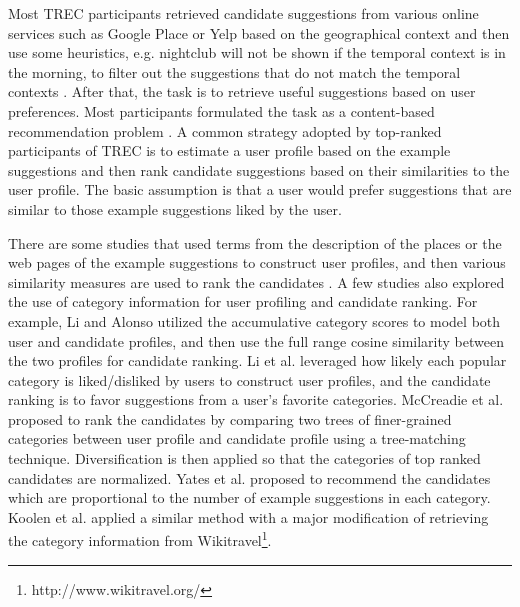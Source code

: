 Most TREC participants retrieved candidate suggestions from various 
online services such as 
Google Place %
or Yelp %
based on the geographical context and then use some heuristics, 
e.g. nightclub will not be shown if the temporal context is in the morning, 
to filter out the suggestions that do not match the temporal contexts 
\cite{adriel:overview, adriel:overview2013}.
After that, the task is to retrieve useful suggestions based on 
user preferences. Most participants formulated the task as a 
content-based recommendation problem 
\cite{irit:treccs2012, georgetown:treccs2012, udel:treccs2012, 
udben:treccs2012, isi:treccs2013, up:treccs2013, udel:treccs2014, 
cmu:treccs2014, bjut:treccs2014, rama:treccs2014, glasgow:treccs2014}. 
A common strategy adopted by top-ranked participants of TREC is to 
estimate a user profile based on the example suggestions and then rank 
candidate suggestions based on their similarities to the user profile. 
The basic assumption is that a user would prefer suggestions that are 
similar to those example suggestions liked by the user.  

There are some studies that used terms from the description of the places or 
the web pages of the example suggestions to construct user profiles, 
and then various similarity measures are used to rank the candidates
\cite{udel:treccs2012,irit:treccs2012,up:treccs2013}. 
A few studies also explored the use of category information for user profiling 
and candidate ranking. For example, 
Li and Alonso \cite{rama:treccs2014} utilized the accumulative category 
scores to model both user and candidate profiles, and then use 
the full range cosine similarity between the two profiles for candidate ranking. 
Li et al. \cite{bjut:treccs2014} leveraged how likely each popular category is 
liked/disliked by users to construct user profiles, and the candidate ranking is 
to favor suggestions from a user's favorite categories. 
McCreadie et al. \cite{glasgow:treccs2014} proposed to rank the 
candidates by comparing two trees of finer-grained categories between 
user profile and candidate profile using a tree-matching technique. 
Diversification is then applied so that the categories of top ranked 
candidates are normalized.
Yates et al. \cite{georgetown:treccs2012} proposed to 
recommend the candidates which are proportional to the number of 
example suggestions in each category.
Koolen et al. \cite{uamst:treccs2013} applied a similar method 
with a major modification of 
retrieving the category information from 
Wikitravel\footnote{http://www.wikitravel.org/}.


